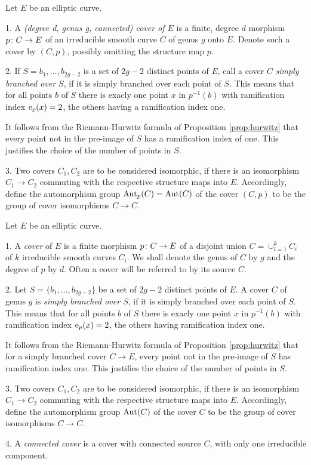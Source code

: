 \begin{defi} Let $E$ be an elliptic curve. 
 
  1. A \emph{(degree d, genus g, connected) cover of $E$} is a finite, degree $d$ morphism $p\colon C\to E$ of an irreducible smooth curve $C$ of genus $g$ onto $E$. Denote such a cover by $(C,p)$, possibly omitting the structure map $p$.

  2. If $S={b_1,\dotsc,b_{2g-2}}$ is a set of $2g-2$ distinct points of $E$, call a cover $C$ \emph{simply branched over $S$}, if it is simply branched over each point of $S$. This means that for all points $b$ of $S$ there is exacly one point $x$ in $p^{-1}(b)$ with ramification index $\operatorname{e}_p(x)=2$, the others having a ramification index one.
  
  It follows from the Riemann-Hurwitz formula of Proposition \ref{prop:hurwitz} that every point not in the pre-image of $S$ has a ramification index of one. This justifies the choice of the number of points in $S$.

  3. Two covers $C_1, C_2$ are to be considered isomorphic, if there is an isomorphism $C_1\to C_2$ commuting with the respective structure maps into $E$. Accordingly, define the automorphism group $\operatorname{Aut}_p(C)=\operatorname{Aut}(C)$ of the cover $(C,p)$ to be the group of cover isomorphisms $C\to C$. 
 
\end{defi}
\fi

\begin{defi} Let $E$ be an elliptic curve.
 
  1. A \emph{cover} of $E$ is a finite morphism $p\colon C\to E$ of a disjoint union $C=\cup_{i=1}^k C_i$ of $k$ irreducible smooth curves $C_i$. We shall denote the genus of $C$ by $g$ and the degree of $p$ by $d$. Often a cover will be referred to by its source $C$.
  
  2. Let $S=\{b_1,\dotsc,b_{2g-2}\}$ be a set of $2g-2$ distinct points of $E$. A cover $C$ of genus $g$ is \emph{simply branched over $S$}, if it is simply branched over each point of $S$. This means that for all points $b$ of $S$ there is exacly one point $x$ in $p^{-1}(b)$ with ramification index $\operatorname{e}_p(x)=2$, the others having ramification index one.
  
  It follows from the Riemann-Hurwitz formula of Proposition \ref{prop:hurwitz} that for a simply branched cover $C\to E$, every point not in the pre-image of $S$ has ramification index one. This justifies the choice of the number of points in $S$.
  
  3. Two covers $C_1, C_2$ are to be considered isomorphic, if there is an isomorphism $C_1\to C_2$ commuting with the respective structure maps into $E$. Accordingly, define the automorphism group $\operatorname{Aut}(C)$ of the cover $C$ to be the group of cover isomorphisms $C\to C$.
  
  4. A \emph{connected cover} is a cover with connected source $C$, \ie with only one irreducible component.
\end{defi}

